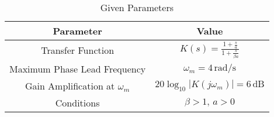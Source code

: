  \begin{table}[h]
        \centering
        \begin{tabular}{|c|c|}
            \hline
            \textbf{Parameter} & \textbf{Value} \\
            \hline
            Transfer Function & \( K(s) = \frac{1 + \frac{s}{a}}{1 + \frac{s}{\beta a}} \) \\
            \hline
            Maximum Phase Lead Frequency & \( \omega_m = 4 \, \text{rad/s} \) \\
            \hline
            Gain Amplification at \( \omega_m \) & \( 20\log_{10}|K(j\omega_m)| = 6 \, \text{dB} \) \\
            \hline
            Conditions & \( \beta > 1, \, a > 0 \) \\
            \hline
        \end{tabular}
        \caption{Given Parameters}
        \label{tab:ashgategivenparameters}
    \end{table}
